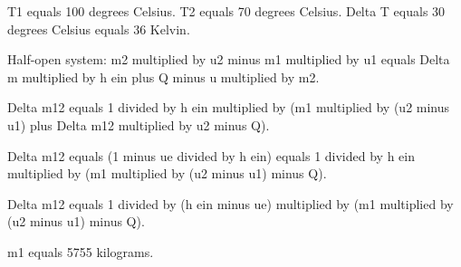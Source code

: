 T1 equals 100 degrees Celsius.  
T2 equals 70 degrees Celsius.  
Delta T equals 30 degrees Celsius equals 36 Kelvin.  

Half-open system:  
m2 multiplied by u2 minus m1 multiplied by u1 equals Delta m multiplied by h ein plus Q minus u multiplied by m2.  

Delta m12 equals 1 divided by h ein multiplied by (m1 multiplied by (u2 minus u1) plus Delta m12 multiplied by u2 minus Q).  

Delta m12 equals (1 minus ue divided by h ein) equals 1 divided by h ein multiplied by (m1 multiplied by (u2 minus u1) minus Q).  

Delta m12 equals 1 divided by (h ein minus ue) multiplied by (m1 multiplied by (u2 minus u1) minus Q).  

m1 equals 5755 kilograms.
